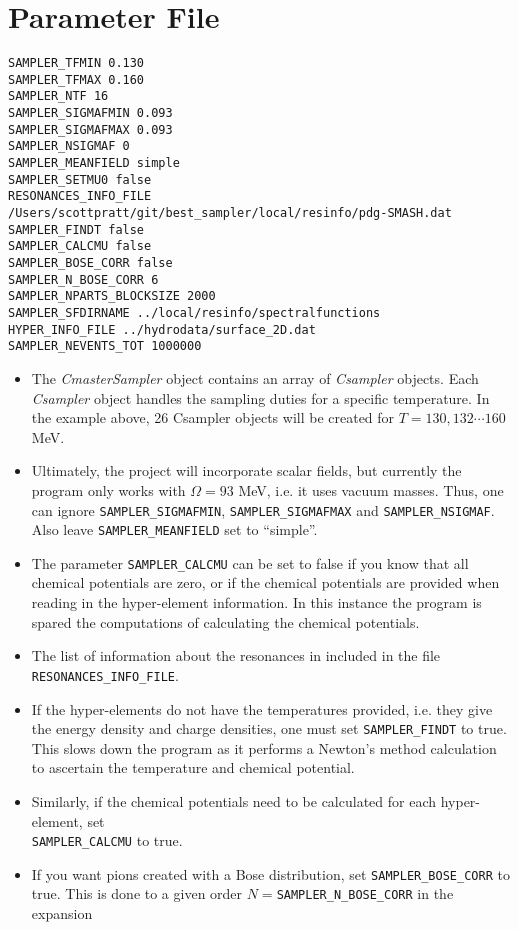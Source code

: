 \section{Parameter File}
{\tt\begin{verbatim}
SAMPLER_TFMIN 0.130
SAMPLER_TFMAX 0.160
SAMPLER_NTF 16
SAMPLER_SIGMAFMIN 0.093
SAMPLER_SIGMAFMAX 0.093
SAMPLER_NSIGMAF 0
SAMPLER_MEANFIELD simple
SAMPLER_SETMU0 false
RESONANCES_INFO_FILE /Users/scottpratt/git/best_sampler/local/resinfo/pdg-SMASH.dat
SAMPLER_FINDT false
SAMPLER_CALCMU false
SAMPLER_BOSE_CORR false
SAMPLER_N_BOSE_CORR 6
SAMPLER_NPARTS_BLOCKSIZE 2000
SAMPLER_SFDIRNAME ../local/resinfo/spectralfunctions
HYPER_INFO_FILE ../hydrodata/surface_2D.dat
SAMPLER_NEVENTS_TOT 1000000
\end{verbatim}}
\begin{itemize}\itemsep=0pt
\item The {\it CmasterSampler} object contains an array of {\it Csampler} objects. Each {\it Csampler} object handles the sampling duties for a specific temperature. In the example above, 26 Csampler objects will be created for $T=130,132\cdots 160$ MeV.
\item Ultimately, the project will incorporate scalar fields, but currently the program only works with $\Omega=93$ MeV, i.e. it uses vacuum masses. Thus, one can ignore {\tt SAMPLER\_SIGMAFMIN}, {\tt SAMPLER\_SIGMAFMAX} and {\tt SAMPLER\_NSIGMAF}. Also leave {\tt SAMPLER\_MEANFIELD} set to ``simple''.
\item The parameter {\tt SAMPLER\_CALCMU} can be set to false if you know that all chemical potentials are zero, or if the chemical potentials are provided when reading in the hyper-element information. In this instance the program is spared the computations of calculating the chemical potentials.
\item The list of information about the resonances in included in the file {\tt RESONANCES\_INFO\_FILE}.
\item If the hyper-elements do not have the temperatures provided, i.e. they give the energy density and charge densities, one must set {\tt SAMPLER\_FINDT} to true. This slows down the program as it performs a Newton's method calculation to ascertain the temperature and chemical potential.
\item Similarly, if the chemical potentials need to be calculated for each hyper-element, set \\{\tt SAMPLER\_CALCMU} to true.
\item If you want pions created with a Bose distribution, set {\tt SAMPLER\_BOSE\_CORR} to true. This is done to a given order $N=${\tt SAMPLER\_N\_BOSE\_CORR} in the expansion

\end{itemize}
